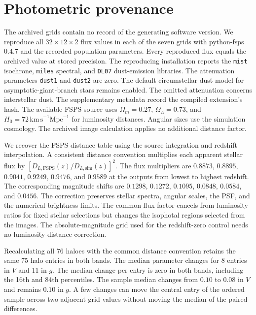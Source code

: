 \documentclass[usenatbib]{mnras}
\begin{document}
\section{Photometric provenance}
The archived grids contain no record of the generating software version.
We reproduce all $32\times12\times2$ flux values in each of the seven
grids with python-fsps 0.4.7 and the recorded population parameters.
Every reproduced flux equals the archived value at stored precision.
The reproducing installation reports the \texttt{mist} isochrone,
\texttt{miles} spectral, and \texttt{DL07} dust-emission libraries.
The attenuation parameters \texttt{dust1} and \texttt{dust2} are zero.
The default circumstellar dust model for asymptotic-giant-branch stars
remains enabled. The omitted attenuation concerns interstellar dust.
The supplementary metadata record the compiled extension's hash.
The available FSPS source uses $\Omega_m=0.27$,
$\Omega_\Lambda=0.73$, and $H_0=72\,\mathrm{km\,s}^{-1}\mathrm{Mpc}^{-1}$
for luminosity distances. Angular sizes use the simulation cosmology.
The archived image calculation applies no additional distance factor.

We recover the FSPS distance table using the source integration and
redshift interpolation. A consistent distance convention multiplies
each apparent stellar flux by
$[D_{L,\mathrm{FSPS}}(z)/D_{L,\mathrm{sim}}(z)]^2$.
The flux multipliers are $0.8873$, $0.8895$, $0.9041$, $0.9249$,
$0.9476$, and $0.9589$ at the outputs from lowest to highest redshift.
The corresponding magnitude shifts are $0.1298$, $0.1272$, $0.1095$,
$0.0848$, $0.0584$, and $0.0456$.
The correction preserves stellar spectra, angular scales, the PSF,
and the numerical brightness limits. The common flux factor cancels
from luminosity ratios for fixed stellar selections but changes the
isophotal regions selected from the images.
The absolute-magnitude grid used for the redshift-zero control needs
no luminosity-distance correction.

Recalculating all 76 haloes with the common distance convention
retains the same 75 halo entries in both bands. The median parameter
changes for 8 entries in $V$ and 11 in $g$. The median change per
entry is zero in both bands, including the 16th and 84th percentiles.
The sample median changes from $0.10$ to $0.08$ in $V$ and remains
$0.10$ in $g$. A few changes can move the central entry of the ordered
sample across two adjacent grid values without moving the median of
the paired differences.
\end{document}
